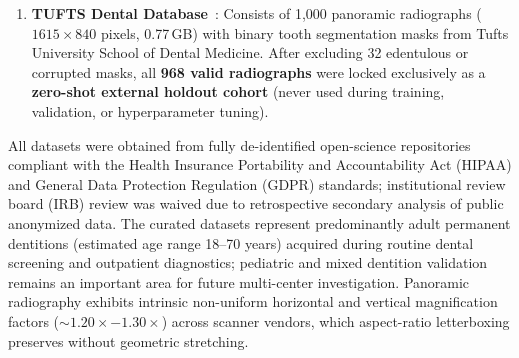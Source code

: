 \documentclass[review]{elsarticle}
\begin{document}
\begin{enumerate}
\begin{itemize}
        \item \emph{DENTEX Auxiliary Subsets}: 693 quadrant-only radiographs (2.18\,GB), 50 official validation radiographs (0.14\,GB), and 1,571 unlabelled radiographs (2.59\,GB) were cataloged in the repository audit as an unlabelled archive for self-supervised pretraining.
    \end{itemize}
    \item \textbf{TUFTS Dental Database}~\cite{tufts2020dental}: Consists of 1,000 panoramic radiographs ($1615 \times 840$ pixels, 0.77\,GB) with binary tooth segmentation masks from Tufts University School of Dental Medicine. After excluding 32 edentulous or corrupted masks, all \textbf{968 valid radiographs} were locked exclusively as a \textbf{zero-shot external holdout cohort} (never used during training, validation, or hyperparameter tuning).
\end{enumerate}
All datasets were obtained from fully de-identified open-science repositories compliant with the Health Insurance Portability and Accountability Act (HIPAA) and General Data Protection Regulation (GDPR) standards; institutional review board (IRB) review was waived due to retrospective secondary analysis of public anonymized data. The curated datasets represent predominantly adult permanent dentitions (estimated age range 18--70 years) acquired during routine dental screening and outpatient diagnostics; pediatric and mixed dentition validation remains an important area for future multi-center investigation. Panoramic radiography exhibits intrinsic non-uniform horizontal and vertical magnification factors ($\sim 1.20\times - 1.30\times$) across scanner vendors, which aspect-ratio letterboxing preserves without geometric stretching.
\end{document}
